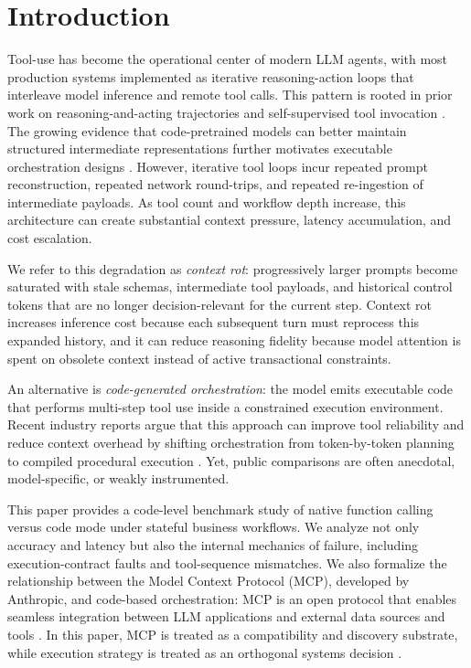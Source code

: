 \documentclass[journal,article,submit,pdftex,moreauthors]{Definitions/mdpi}
\begin{document}
\section{Introduction}

Tool-use has become the operational center of modern LLM agents, with most production systems implemented as iterative reasoning-action loops that interleave model inference and remote tool calls. This pattern is rooted in prior work on reasoning-and-acting trajectories and self-supervised tool invocation \cite{ref-react,ref-toolformer}. The growing evidence that code-pretrained models can better maintain structured intermediate representations further motivates executable orchestration designs \cite{ref-code-commonsense}. However, iterative tool loops incur repeated prompt reconstruction, repeated network round-trips, and repeated re-ingestion of intermediate payloads. As tool count and workflow depth increase, this architecture can create substantial context pressure, latency accumulation, and cost escalation.

We refer to this degradation as \emph{context rot}: progressively larger prompts become saturated with stale schemas, intermediate tool payloads, and historical control tokens that are no longer decision-relevant for the current step. Context rot increases inference cost because each subsequent turn must reprocess this expanded history, and it can reduce reasoning fidelity because model attention is spent on obsolete context instead of active transactional constraints.

An alternative is \emph{code-generated orchestration}: the model emits executable code that performs multi-step tool use inside a constrained execution environment. Recent industry reports argue that this approach can improve tool reliability and reduce context overhead by shifting orchestration from token-by-token planning to compiled procedural execution \cite{ref-cf-codemode,ref-code-survey}. Yet, public comparisons are often anecdotal, model-specific, or weakly instrumented.

This paper provides a code-level benchmark study of native function calling versus code mode under stateful business workflows. We analyze not only accuracy and latency but also the internal mechanics of failure, including execution-contract faults and tool-sequence mismatches. We also formalize the relationship between the Model Context Protocol (MCP), developed by Anthropic, and code-based orchestration: MCP is an open protocol that enables seamless integration between LLM applications and external data sources and tools \cite{ref-mcp}. In this paper, MCP is treated as a compatibility and discovery substrate, while execution strategy is treated as an orthogonal systems decision \cite{ref-mcp-codemode}.
\end{document}
